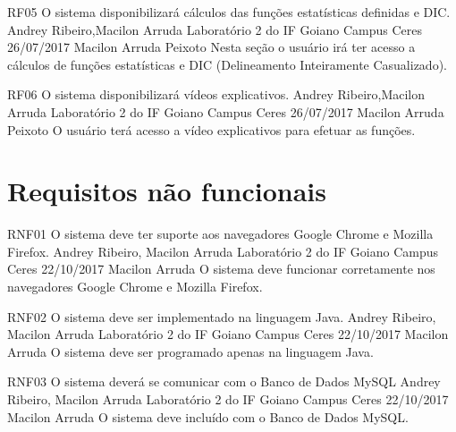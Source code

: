  \requisitoFuncional
 {RF05}
 {O sistema disponibilizará cálculos das funções estatísticas definidas e DIC.}
 {Andrey Ribeiro,Macilon Arruda}
 {Laboratório 2 do IF Goiano Campus Ceres}
 {26/07/2017}
 {Macilon Arruda Peixoto}
 {Nesta seção o usuário irá ter acesso a cálculos de funções estatísticas e DIC (Delineamento Inteiramente Casualizado).
 }
 
 \requisitoFuncional
 {RF06}
 {O sistema disponibilizará vídeos explicativos.}
 {Andrey Ribeiro,Macilon Arruda}
 {Laboratório 2 do IF Goiano Campus Ceres}
 {26/07/2017}
 {Macilon Arruda Peixoto}
 {O usuário terá acesso a vídeo explicativos para efetuar as funções.
 }



\section{Requisitos não funcionais} 
 
 \requisitoNaoFuncional
 {RNF01}
 {O sistema deve ter suporte aos navegadores Google Chrome e Mozilla Firefox.}
 {Andrey Ribeiro, Macilon Arruda}
 {Laboratório 2 do IF Goiano Campus Ceres}
 {22/10/2017}
 {Macilon Arruda}
 {O sistema deve funcionar corretamente nos navegadores Google Chrome e Mozilla Firefox.
 }

 \requisitoNaoFuncional
 {RNF02}
 {O sistema deve ser implementado na linguagem Java.}
 {Andrey Ribeiro, Macilon Arruda}
 {Laboratório 2 do IF Goiano Campus Ceres}
 {22/10/2017}
 {Macilon Arruda}
 {O sistema deve ser programado apenas na linguagem Java.
 }
 
 \requisitoNaoFuncional
 {RNF03}
 {O sistema deverá se comunicar com o Banco de Dados MySQL}
 {Andrey Ribeiro, Macilon Arruda}
 {Laboratório 2 do IF Goiano Campus Ceres}
 {22/10/2017}
 {Macilon Arruda}
 {O sistema deve incluído com o Banco de Dados MySQL.
 }

